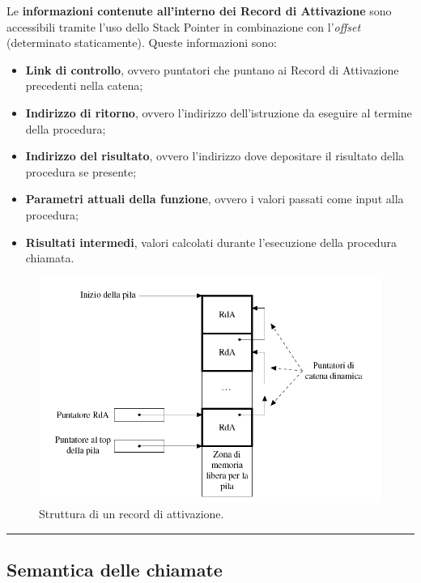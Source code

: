 \documentclass[a4paper]{article}
\newcommand{\longline}{\noindent\rule{\textwidth}{0.4pt}}
\begin{document}
 	\noindent
 	Le \textbf{informazioni contenute all'interno dei Record di Attivazione} sono accessibili tramite l'uso dello Stack Pointer in combinazione con l'\emph{offset} (determinato staticamente). Queste informazioni sono:
 	\begin{itemize}
 		\item \textbf{Link di controllo}, ovvero puntatori che puntano ai Record di Attivazione precedenti nella catena;
 		
 		\item \textbf{Indirizzo di ritorno}, ovvero l'indirizzo dell'istruzione da eseguire al termine della procedura;
 		
 		\item \textbf{Indirizzo del risultato}, ovvero l'indirizzo dove depositare il risultato della procedura se presente;
 		
 		\item \textbf{Parametri attuali della funzione}, ovvero i valori passati come input alla procedura;
 		
 		\item \textbf{Risultati intermedi}, valori calcolati durante l'esecuzione della procedura chiamata.
 	\end{itemize}\newpage
 	
 	\begin{figure}[!htp]
 		\centering
 		\includegraphics[width=\textwidth]{img/record_di_attivazione.png}
 		\caption{Struttura di un record di attivazione.}
 	\end{figure}
 	
 	\longline
 	
 	\subsection{Semantica delle chiamate}\label{semantica delle chiamate}
 	
\end{document}
